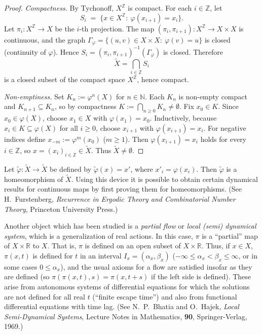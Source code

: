 \begin{proof}
    \emph{Compactness.}
    By Tychonoff, $X^{\mathbb Z}$ is compact. For each $i\in\mathbb Z$, let
    \[
        S_i \;=\; \{x\in X^{\mathbb Z}:\ \varphi(x_{i+1})=x_i\}.
    \]
    Let $\pi_i:X^{\mathbb Z}\to X$ be the $i$-th projection. The map
    $(\pi_i,\pi_{i+1}):X^{\mathbb Z}\to X\times X$ is continuous, and the graph
    $\Gamma_\varphi=\{(u,v)\in X\times X:\ \varphi(v)=u\}$ is closed (continuity of $\varphi$).
    Hence $S_i=(\pi_i,\pi_{i+1})^{-1}(\Gamma_\varphi)$ is closed. Therefore
    \[
        \widetilde{X}=\bigcap_{i\in\mathbb Z} S_i
    \]
    is a closed subset of the compact space $X^{\mathbb Z}$, hence compact.

    \medskip
    \emph{Non-emptiness.}
    Set $K_n:=\varphi^n(X)$ for $n\in\mathbb N$. Each $K_n$ is non-empty compact and
    $K_{n+1}\subseteq K_n$, so by compactness $\displaystyle K:=\bigcap_{n\ge 0} K_n\neq\emptyset$.
    Fix $x_0\in K$. Since $x_0\in \varphi(X)$, choose $x_1\in X$ with $\varphi(x_1)=x_0$.
    Inductively, because $x_i\in K\subseteq \varphi(X)$ for all $i\ge 0$, choose $x_{i+1}$ with
    $\varphi(x_{i+1})=x_i$. For negative indices define $x_{-m}:=\varphi^{m}(x_0)$ ($m\ge 1$).
    Then $\varphi(x_{i+1})=x_i$ holds for every $i\in\mathbb Z$, so $x=(x_i)_{i\in\mathbb Z}\in\widetilde{X}$.
    Thus $\widetilde{X}\neq\emptyset$.
\end{proof}

Let $\tilde{\varphi} : \tilde{X} \to \tilde{X}$ be defined by $\tilde{\varphi}(x) = x'$, where $x'_{i} = \varphi(x_{i})$. Then $\tilde{\varphi}$ is a homeomorphism of $\tilde{X}$. Using this device it is possible to obtain certain dynamical results for continuous maps by first proving them for homeomorphisms. (See H.~Furstenberg, \emph{Recurrence in Ergodic Theory and Combinatorial Number Theory}, Princeton University Press.)

Another object which has been studied is a \emph{partial flow} or \emph{local (semi) dynamical system}, which is a generalization of real actions. In this case, $\pi$ is a ``partial'' map of $X \times \mathbb{R}$ to $X$. That is, $\pi$ is defined on an open subset of $X \times \mathbb{R}$. Thus, if $x \in X$, $\pi(x,t)$ is defined for $t$ in an interval $I_x = (\alpha_x, \beta_x)$ ($-\infty \le \alpha_x < \beta_x \le \infty$, or in some cases $0 \le \alpha_x$), and the usual axioms for a flow are satisfied insofar as they are defined (so $\pi(\pi(x,t),s) = \pi(x,t+s)$ if the left side is defined). These arise from autonomous systems of differential equations for which the solutions are not defined for all real $t$ (``finite escape time'') and also from functional differential equations with time lag. (See N.\ P.\ Bhatia and O.\ Hajek, \emph{Local Semi-Dynamical Systems}, Lecture Notes in Mathematics, \textbf{90}, Springer-Verlag, 1969.)

